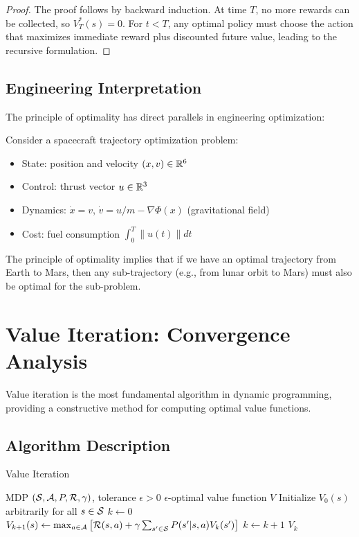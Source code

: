 \begin{proof}
The proof follows by backward induction. At time $T$, no more rewards can be collected, so $V_T^*(s) = 0$. For $t < T$, any optimal policy must choose the action that maximizes immediate reward plus discounted future value, leading to the recursive formulation.
\end{proof}

\subsection{Engineering Interpretation}

The principle of optimality has direct parallels in engineering optimization:

\begin{examplebox}
Consider a spacecraft trajectory optimization problem:
\begin{itemize}
    \item State: position and velocity $(x, v) \in \mathbb{R}^6$
    \item Control: thrust vector $u \in \mathbb{R}^3$
    \item Dynamics: $\dot{x} = v$, $\dot{v} = u/m - \nabla \Phi(x)$ (gravitational field)
    \item Cost: fuel consumption $\int_0^T \|u(t)\| dt$
\end{itemize}

The principle of optimality implies that if we have an optimal trajectory from Earth to Mars, then any sub-trajectory (e.g., from lunar orbit to Mars) must also be optimal for the sub-problem.
\end{examplebox}

\section{Value Iteration: Convergence Analysis}

Value iteration is the most fundamental algorithm in dynamic programming, providing a constructive method for computing optimal value functions.

\subsection{Algorithm Description}

\begin{algorithm}
\caption{Value Iteration}
\begin{algorithmic}
\REQUIRE MDP $(\mathcal{S}, \mathcal{A}, P, \mathcal{R}, \gamma)$, tolerance $\epsilon > 0$
\ENSURE $\epsilon$-optimal value function $V$
\STATE Initialize $V_0(s)$ arbitrarily for all $s \in \mathcal{S}$
\STATE $k \leftarrow 0$
\REPEAT
        \STATE $V_{k+1}(s) \leftarrow \max_{a \in \mathcal{A}} \left[\mathcal{R}(s,a) + \gamma \sum_{s' \in \mathcal{S}} P(s'|s,a) V_k(s')\right]$
    \ENDFOR
    \STATE $k \leftarrow k + 1$
\RETURN $V_k$
\end{algorithmic}
\end{algorithm}

